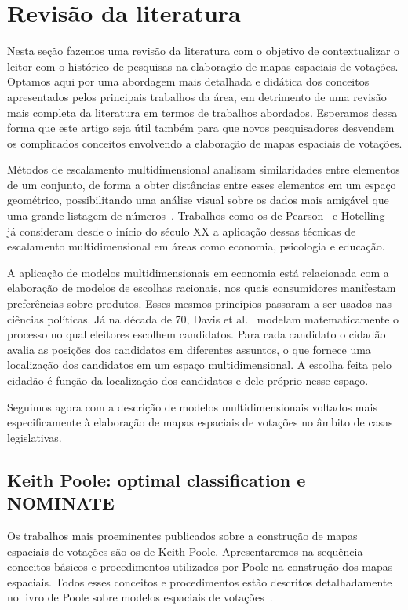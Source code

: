 \documentclass[a4paper, 12pt]{article}
\newcommand\nominate{NOMINATE\xspace}
\begin{document}
\section{Revisão da literatura}
\label{sec:revbib}

Nesta seção fazemos uma revisão da literatura com o objetivo de contextualizar o leitor com o histórico de pesquisas na elaboração de mapas espaciais de votações. Optamos aqui por uma abordagem mais detalhada e didática dos conceitos apresentados pelos principais trabalhos da área, em detrimento de uma revisão mais completa da literatura em termos de trabalhos abordados. Esperamos dessa forma que este artigo seja útil também para que novos pesquisadores desvendem os complicados conceitos envolvendo a elaboração de mapas espaciais de votações. 

Métodos de escalamento multidimensional analisam similaridades entre elementos de um conjunto, de forma a obter distâncias entre esses elementos em um espaço geométrico, possibilitando uma análise visual sobre os dados mais amigável que uma grande listagem de números~\cite{borg2005mds}. Trabalhos como os de Pearson~\cite{pearson1901} e Hotelling~\cite{hotelling1933} já consideram desde o início do século XX a aplicação dessas técnicas de escalamento multidimensional em áreas como economia, psicologia e educação.

A aplicação de modelos multidimensionais em economia está relacionada com a elaboração de modelos de escolhas racionais, nos quais consumidores manifestam preferências sobre produtos. Esses mesmos princípios passaram a ser usados nas ciências políticas. Já na década de 70, Davis et al.~\cite{davis1970electoral} modelam matematicamente o processo no qual eleitores escolhem candidatos. Para cada candidato o cidadão avalia as posições dos candidatos em diferentes assuntos, o que fornece uma localização dos candidatos em um espaço multidimensional. A escolha feita pelo cidadão é função da localização dos candidatos e dele próprio nesse espaço. 

Seguimos agora com a descrição de modelos multidimensionais voltados mais especificamente à elaboração de mapas espaciais de votações no âmbito de casas legislativas.

\subsection*{Keith Poole: optimal classification e \nominate}

Os trabalhos mais proeminentes publicados sobre a construção de mapas espaciais de votações são os de Keith Poole. Apresentaremos na sequência conceitos básicos e procedimentos utilizados por Poole na construção dos mapas espaciais. Todos esses conceitos e procedimentos estão descritos detalhadamente no livro de Poole sobre modelos espaciais de votações~\cite{poole2005book}.
\end{document}
